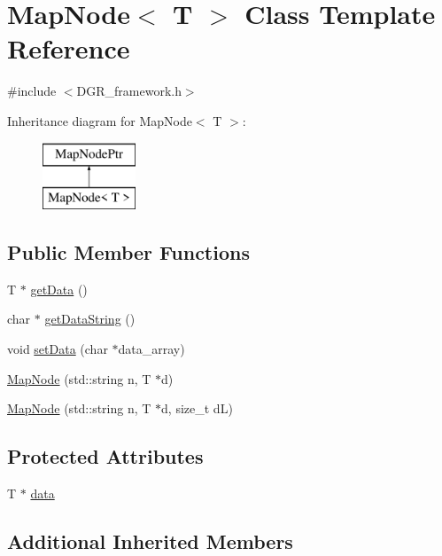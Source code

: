 \hypertarget{classMapNode}{\section{Map\+Node$<$ T $>$ Class Template Reference}
\label{classMapNode}
}


{\ttfamily \#include $<$D\+G\+R\+\_\+framework.\+h$>$}

Inheritance diagram for Map\+Node$<$ T $>$\+:\begin{figure}[H]
\begin{center}
\leavevmode
\includegraphics[height=2.000000cm]{classMapNode}
\end{center}
\end{figure}
\subsection*{Public Member Functions}
\begin{DoxyCompactItemize}
\item 
T $\ast$ \hyperlink{classMapNode_aac2d9cb3f7ae4f2e39a4ceaff588318c}{get\+Data} ()
\item 
char $\ast$ \hyperlink{classMapNode_aec1d6c32ce5cf507bdf8459cdd9a00b8}{get\+Data\+String} ()
\item 
void \hyperlink{classMapNode_a78cc24f37a1d1b4bda5075284ff53f92}{set\+Data} (char $\ast$data\+\_\+array)
\item 
\hyperlink{classMapNode_aa1dc56c3ee0462fd30f11f70a758002d}{Map\+Node} (std\+::string n, T $\ast$d)
\item 
\hyperlink{classMapNode_a56f35b20fd5e5bcc8425640f95512fd9}{Map\+Node} (std\+::string n, T $\ast$d, size\+\_\+t d\+L)
\end{DoxyCompactItemize}
\subsection*{Protected Attributes}
\begin{DoxyCompactItemize}
\item 
T $\ast$ \hyperlink{classMapNode_a61524bb1f8518fb99166e8880b065c9e}{data}
\end{DoxyCompactItemize}
\subsection*{Additional Inherited Members}


